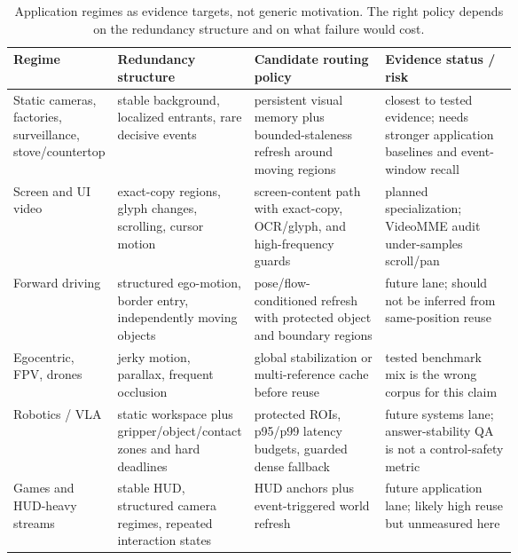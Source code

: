 \begin{table}[H]
\centering
\caption{Application regimes as evidence targets, not generic motivation. The
right policy depends on the redundancy structure and on what failure would
cost.}
\label{tab:application-regimes}
\footnotesize
\renewcommand{\arraystretch}{\PaperTableStretch}
\begin{tabularx}{\linewidth}{@{}
  >{\raggedright\arraybackslash}p{0.18\linewidth}
  >{\raggedright\arraybackslash}p{0.22\linewidth}
  >{\raggedright\arraybackslash}p{0.26\linewidth}
  >{\raggedright\arraybackslash}X
@{}}
\toprule
Regime & Redundancy structure & Candidate routing policy & Evidence status / risk \\
\midrule
Static cameras, factories, surveillance, stove/countertop & stable background,
localized entrants, rare decisive events & persistent visual memory plus
bounded-staleness refresh around moving regions & closest to tested evidence;
needs stronger application baselines and event-window recall \\
\addlinespace[0.25em]
Screen and UI video & exact-copy regions, glyph changes, scrolling, cursor
motion & screen-content path with exact-copy, OCR/glyph, and high-frequency
guards & planned specialization; VideoMME audit under-samples scroll/pan \\
\addlinespace[0.25em]
Forward driving & structured ego-motion, border entry, independently moving
objects & pose/flow-conditioned refresh with protected object and boundary
regions & future lane; should not be inferred from same-position reuse \\
\addlinespace[0.25em]
Egocentric, FPV, drones & jerky motion, parallax, frequent occlusion & global
stabilization or multi-reference cache before reuse & tested benchmark mix is
the wrong corpus for this claim \\
\addlinespace[0.25em]
Robotics / VLA & static workspace plus gripper/object/contact zones and hard
deadlines & protected ROIs, p95/p99 latency budgets, guarded dense fallback & future
systems lane; answer-stability QA is not a control-safety metric \\
\addlinespace[0.25em]
Games and HUD-heavy streams & stable HUD, structured camera regimes, repeated
interaction states & HUD anchors plus event-triggered world refresh & future
application lane; likely high reuse but unmeasured here \\
\bottomrule
\end{tabularx}
\end{table}

